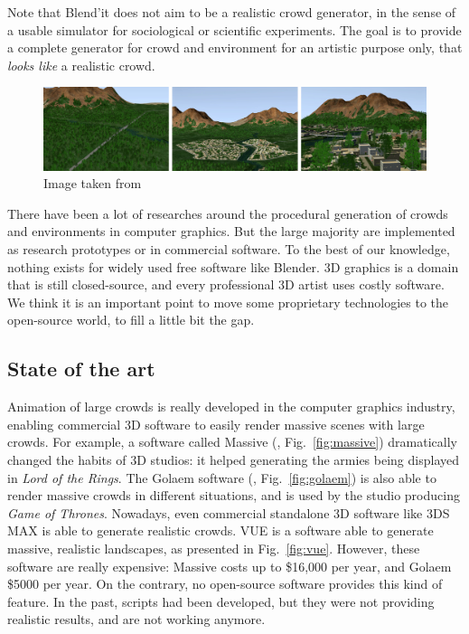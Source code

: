 Note that Blend'it does not aim to be a realistic crowd generator, in
the sense of a usable simulator for sociological or scientific
experiments. The goal is to provide a complete generator for crowd and
environment for an artistic purpose only, that \textit{looks like} a
realistic crowd.

\begin{figure}[h]
  \includegraphics[width=15cm]{img/env1.jpg}
  \caption{Image taken from \cite{DeclarativeArchitecture}}
  \label{fig:env}
\end{figure}


There have been a lot of researches around the procedural generation
of crowds and environments in computer graphics. But the large
majority are implemented as research prototypes or in commercial
software. To the best of our knowledge, nothing exists for widely used
free software like Blender. 3D graphics is a domain that is still
closed-source, and every professional 3D artist uses costly
software. We think it is an important point to move some proprietary
technologies to the open-source world, to fill a little bit the gap.

\subsection{State of the art}



Animation of large crowds is really developed in the computer graphics
industry, enabling commercial 3D software to easily render massive
scenes with large crowds. For example, a software called Massive
(\cite{Massive}, Fig.~\ref{fig:massive}) dramatically changed the
habits of 3D studios: it helped generating the armies being displayed
in \textit{Lord of the Rings}. The Golaem software (\cite{Golaem},
Fig.~\ref{fig:golaem}) is also able to render massive crowds
in different situations, and is used by the studio producing
\textit{Game of Thrones}. Nowadays, even commercial standalone 3D
software like 3DS MAX \cite{3dsmax} is able to generate realistic
crowds. VUE is a software able to generate massive, realistic
landscapes, as presented in Fig.~\ref{fig:vue}. However, these software are really
expensive: Massive costs up to \$16,000 per year, and Golaem \$5000
per year. On the contrary, no open-source software provides this
kind of feature. In the past, scripts had been developed, but they
were not providing realistic results, and are not working anymore.


